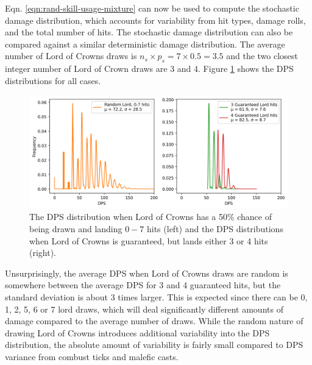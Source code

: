 \documentclass{article}
\begin{document}
    Eqn. \ref{eqn:rand-skill-usage-mixture} can now be used to compute the stochastic damage distribution, which accounts for variability from hit types, damage rolls, and the total number of hits. The stochastic damage distribution can also be compared against a similar deterministic damage distribution. The average number of Lord of Crowns draws is $n_s \times p_s = 7 \times 0.5 = 3.5$ and the two closest integer number of Lord of Crown draws are 3 and 4. Figure \ref{fig:avg-rotation} shows the DPS distributions for all cases.

    \begin{figure}[H]
        \centering
        \includegraphics[width=0.99\linewidth]{img/averaged-rotation.png}
        \caption{The DPS distribution when Lord of Crowns has a 50\% chance of being drawn and landing $0 - 7$ hits (left) and the DPS distributions when Lord of Crowns is guaranteed, but lands either 3 or 4 hits (right).}\label{fig:avg-rotation}
    \end{figure}
    Unsurprisingly, the average DPS when Lord of Crowns draws are random is somewhere between the average DPS for 3 and 4 guaranteed hits, but the standard deviation is about 3 times larger. This is expected since there can be 0, 1, 2, 5, 6 or 7 lord draws, which will deal significantly different amounts of damage compared to the average number of draws. While the random nature of drawing Lord of Crowns introduces additional variability into the DPS distribution, the absolute amount of variability is fairly small compared to DPS variance from combust ticks and malefic casts.
    
\end{document}
